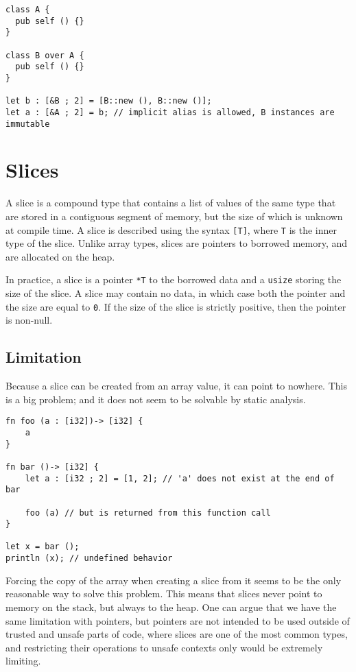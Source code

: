 \begin{lstlisting}[style=coloredverbatim]
class A {
  pub self () {}
}

class B over A {
  pub self () {}
}

let b : [&B ; 2] = [B::new (), B::new ()];
let a : [&A ; 2] = b; // implicit alias is allowed, B instances are immutable
\end{lstlisting}

\section{Slices}%
\label{sec:slices}

A slice is a compound type that contains a list of values of the same type that
are stored in a contiguous segment of memory, but the size of which is unknown
at compile time. A slice is described using the syntax \texttt{[T]}, where
\texttt{T} is the inner type of the slice. Unlike array types, slices are
pointers to borrowed memory, and are allocated on the heap.

In practice, a slice is a pointer \texttt{*T} to the borrowed data and a
\texttt{usize} storing the size of the slice. A slice may contain no data, in
which case both the pointer and the size are equal to \texttt{0}. If the size of
the slice is strictly positive, then the pointer is non-null.

\subsection{Limitation}%
\label{sec:slice_lim}

Because a slice can be created from an array value, it can point to nowhere.
This is a big problem; and it does not seem to be solvable by static analysis.

\begin{lstlisting}[style=coloredverbatim]
fn foo (a : [i32])-> [i32] {
    a
}

fn bar ()-> [i32] {
    let a : [i32 ; 2] = [1, 2]; // 'a' does not exist at the end of bar

    foo (a) // but is returned from this function call
}

let x = bar ();
println (x); // undefined behavior
\end{lstlisting}

Forcing the copy of the array when creating a slice from it seems to be the only
reasonable way to solve this problem. This means that slices never point to
memory on the stack, but always to the heap. One can argue that we have the same
limitation with pointers, but pointers are not intended to be used outside of
trusted and unsafe parts of code, where slices are one of the most common types,
and restricting their operations to unsafe contexts only would be extremely
limiting.

